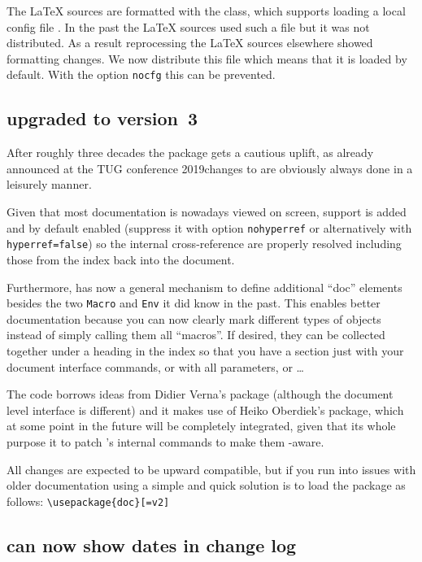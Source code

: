 \documentclass{ltnews}
\providecommand\Dash {\unskip \textemdash}
\providecommand\option[1]{\texttt{#1}}
\begin{document}
The \LaTeX{} sources are formatted with the  class,
which supports loading a local config file . In the
past the \LaTeX{} sources used such a file but it was not distributed.
As a result reprocessing the \LaTeX{} sources elsewhere showed
formatting changes.  We now distribute this file which means that it
is loaded by default. With the option \option{nocfg} this can be
prevented.


\subsection{ upgraded to version~3}

After roughly three decades the  package gets a cautious
uplift, as already announced at the TUG conference 2019\Dash changes
to  are obviously always done in a leisurely manner.

Given that most documentation is nowadays viewed on screen,
 support is added and by default enabled (suppress it
with option \option{nohyperref} or alternatively with
\option{hyperref}\texttt{=false}) so the internal cross-reference are
properly resolved including those from the index back into the
document.

Furthermore,  has now a general mechanism to define
additional \enquote{doc} elements besides the two \texttt{Macro} and
\texttt{Env} it did know in the past. This enables better
documentation because you can now clearly mark different types of
objects instead of simply calling them all \enquote{macros}.
If desired, they can be collected together under a heading
in the index so that you have a section just with your document
interface commands, or with all parameters, or \ldots

The code borrows ideas from Didier Verna's  package (although
the document level interface is different) and it makes use of Heiko
Oberdiek's  package, which at some point in the future
will be completely integrated, given that its whole purpose it to
patch 's internal commands to make them -aware.

All changes are expected to be upward compatible, but if you run into
issues with older documentation using  a simple and quick
solution is to load the package as follows:
\verb/\usepackage{doc}[=v2]/

\subsection{ can now show dates in change log}
\end{document}
